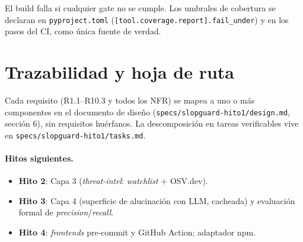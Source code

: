 \documentclass[11pt,a4paper]{article}
\begin{document}
El build falla si cualquier gate no se cumple. Los umbrales de cobertura se declaran en
\texttt{pyproject.toml} (\texttt{[tool.coverage.report].fail_under}) y en los
pasos del CI, como única fuente de verdad.

\section{Trazabilidad y hoja de ruta}

Cada requisito (R1.1--R10.3 y todos los NFR) se mapea a uno o más componentes en el
documento de diseño (\texttt{specs/slopguard-hito1/design.md}, sección 6), sin
requisitos huérfanos. La descomposición en tareas verificables vive en
\texttt{specs/slopguard-hito1/tasks.md}.

\paragraph{Hitos siguientes.}
\begin{itemize}[nosep]
  \item \textbf{Hito 2}: Capa 3 (\emph{threat-intel}: \emph{watchlist} + OSV.dev).
  \item \textbf{Hito 3}: Capa 4 (superficie de alucinación con LLM, cacheada) y
  evaluación formal de \emph{precision}/\emph{recall}.
  \item \textbf{Hito 4}: \emph{frontends} pre-commit y GitHub Action; adaptador npm.
\end{itemize}
\end{document}
